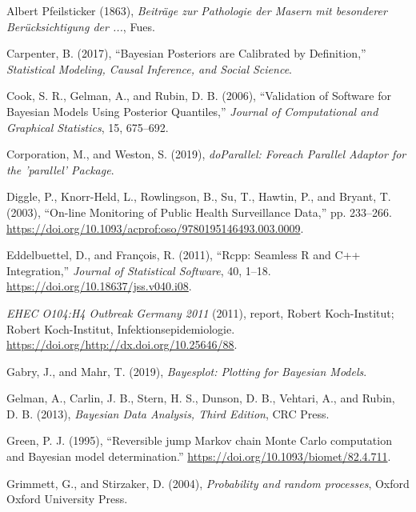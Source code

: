 \documentclass[11pt,a4paper]{article}
\begin{document}
\leavevmode\hypertarget{ref-albert_pfeilsticker_beitrage_1863}{}%
Albert Pfeilsticker (1863), \emph{Beiträge zur Pathologie der Masern mit
besonderer Berücksichtigung der ...}, Fues.

\leavevmode\hypertarget{ref-carpenter_bayesian_2017}{}%
Carpenter, B. (2017), ``Bayesian Posteriors are Calibrated by
Definition,'' \emph{Statistical Modeling, Causal Inference, and Social
Science}.

\leavevmode\hypertarget{ref-cook_validation_2006}{}%
Cook, S. R., Gelman, A., and Rubin, D. B. (2006), ``Validation of
Software for Bayesian Models Using Posterior Quantiles,'' \emph{Journal
of Computational and Graphical Statistics}, 15, 675--692.

\leavevmode\hypertarget{ref-corporation_doparallel:_2019}{}%
Corporation, M., and Weston, S. (2019), \emph{doParallel: Foreach
Parallel Adaptor for the 'parallel' Package}.

\leavevmode\hypertarget{ref-diggle_-line_2003}{}%
Diggle, P., Knorr-Held, L., Rowlingson, B., Su, T., Hawtin, P., and
Bryant, T. (2003), ``On-line Monitoring of Public Health Surveillance
Data,'' pp. 233--266.
\url{https://doi.org/10.1093/acprof:oso/9780195146493.003.0009}.

\leavevmode\hypertarget{ref-eddelbuettel_rcpp:_2011}{}%
Eddelbuettel, D., and François, R. (2011), ``Rcpp: Seamless R and C++
Integration,'' \emph{Journal of Statistical Software}, 40, 1--18.
\url{https://doi.org/10.18637/jss.v040.i08}.

\leavevmode\hypertarget{ref-noauthor_ehec_2011}{}%
\emph{EHEC O104:H4 Outbreak Germany 2011} (2011), report, Robert
Koch-Institut; Robert Koch-Institut, Infektionsepidemiologie.
\url{https://doi.org/http://dx.doi.org/10.25646/88}.

\leavevmode\hypertarget{ref-gabry_bayesplot:_2019}{}%
Gabry, J., and Mahr, T. (2019), \emph{Bayesplot: Plotting for Bayesian
Models}.

\leavevmode\hypertarget{ref-gelman_bayesian_2013}{}%
Gelman, A., Carlin, J. B., Stern, H. S., Dunson, D. B., Vehtari, A., and
Rubin, D. B. (2013), \emph{Bayesian Data Analysis, Third Edition}, CRC
Press.

\leavevmode\hypertarget{ref-green_reversible_1995}{}%
Green, P. J. (1995), ``Reversible jump Markov chain Monte Carlo
computation and Bayesian model determination.''
\url{https://doi.org/10.1093/biomet/82.4.711}.

\leavevmode\hypertarget{ref-grimmett_probability_2004}{}%
Grimmett, G., and Stirzaker, D. (2004), \emph{Probability and random
processes}, Oxford Oxford University Press.
\end{document}

